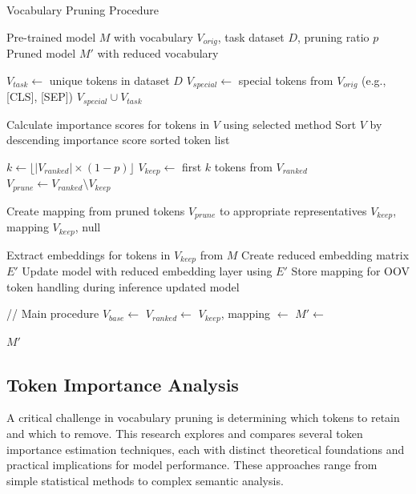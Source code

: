 \documentclass[twocolumn]{article}
\begin{document}
\begin{algorithm}[H]
\caption{Vocabulary Pruning Procedure}
\label{alg:hybrid_pruning}
\begin{algorithmic}[1]
\footnotesize
\Require Pre-trained model $M$ with vocabulary $V_{orig}$, task dataset $D$, pruning ratio $p$
\Ensure Pruned model $M'$ with reduced vocabulary

    \State $V_{task} \gets $ unique tokens in dataset $D$
    \State $V_{special} \gets $ special tokens from $V_{orig}$ (e.g., [CLS], [SEP])
    \State \Return $V_{special} \cup V_{task}$ 
\EndFunction

    \State Calculate importance scores for tokens in $V$ using selected method
    \State Sort $V$ by descending importance score
    \State \Return sorted token list
\EndFunction

    \State $k \gets \lfloor |V_{ranked}| \times (1 - p) \rfloor$ 
    \State $V_{keep} \gets $ first $k$ tokens from $V_{ranked}$
    \State $V_{prune} \gets V_{ranked} \setminus V_{keep}$ 
    
        \State Create mapping from pruned tokens $V_{prune}$ to appropriate representatives
        \State \Return $V_{keep}$, mapping
    \Else
        \State \Return $V_{keep}$, null
    \EndIf
\EndFunction

    \State Extract embeddings for tokens in $V_{keep}$ from $M$
    \State Create reduced embedding matrix $E'$
    \State Update model with reduced embedding layer using $E'$
        \State Store mapping for OOV token handling during inference
    \EndIf
    \State \Return updated model
\EndFunction

\State // Main procedure
\State $V_{base} \gets $ 
\State $V_{ranked} \gets $ 
\State $V_{keep}$, mapping $\gets $ 
\State $M' \gets $ 

\State \Return $M'$ 
\end{algorithmic}
\end{algorithm}

\subsection{Token Importance Analysis}
A critical challenge in vocabulary pruning is determining which tokens to retain and which to remove. This research explores and compares several token importance estimation techniques, each with distinct theoretical foundations and practical implications for model performance. These approaches range from simple statistical methods to complex semantic analysis.
\end{document}
